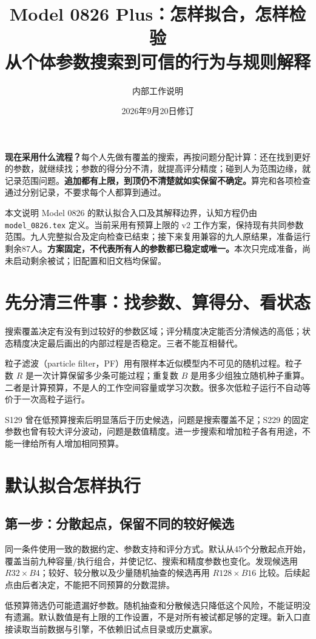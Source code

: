 \documentclass[11pt]{article}
\title{Model 0826 Plus：怎样拟合，怎样检验\\\large 从个体参数搜索到可信的行为与规则解释}
\author{内部工作说明}
\date{2026年9月20日修订}
\newcommand{\term}[1]{\textbf{#1}}
\begin{document}
\maketitle
\noindent\term{现在采用什么流程？}每个人先做有覆盖的搜索，再按问题分配计算：还在找到更好的参数，就继续找；参数的得分分不清，就提高评分精度；碰到人为范围边缘，就记录范围问题。\term{追加都有上限，到顶仍不清楚就如实保留不确定。}算完和各项检查通过分别记录，不要求每个人都算到通过。

本文说明 Model 0826 的默认拟合入口及其解释边界，认知方程仍由 \texttt{model\_0826.tex} 定义。当前采用有预算上限的 v2 工作方案，保持现有共同参数范围。九人完整拟合及定向检查已结束；接下来复用兼容的九人原结果，准备运行剩余87人。\term{方案固定，不代表所有人的参数都已稳定或唯一。}本次只完成准备，尚未启动剩余被试；旧配置和旧文档均保留。

\section{先分清三件事：找参数、算得分、看状态}
搜索覆盖决定有没有到过较好的参数区域；评分精度决定能否分清候选的高低；状态精度决定最后画出的内部过程是否稳定。三者不能互相替代。

粒子滤波（particle filter，PF）用有限样本近似模型内不可见的随机过程。粒子数 $R$ 是一次计算保留多少条可能过程；重复数 $B$ 是用多少组独立随机种子重算。二者是计算预算，不是人的工作空间容量或学习次数。很多次低粒子运行不自动等价于一次高粒子运行。

S129 曾在低预算搜索后明显落后于历史候选，问题是搜索覆盖不足；S229 的固定参数也曾有较大评分波动，问题是数值精度。进一步搜索和增加粒子各有用途，不能一律给所有人增加相同预算。

\section{默认拟合怎样执行}
\subsection{第一步：分散起点，保留不同的较好候选}
同一条件使用一致的数据约定、参数支持和评分方式。默认从45个分散起点开始，覆盖当前九种容量/执行组合，并使记忆、搜索和精度参数也变化。发现候选用 $R32\times B4$；较好、较分散以及少量随机抽查的候选再用 $R128\times B16$ 比较。后续起点由后者决定，不能把不同预算的分数混排。

低预算筛选仍可能遗漏好参数。随机抽查和分散候选只降低这个风险，不能证明没有遗漏。默认数值是有上限的工作设置，不是对所有被试都足够的定理。新入口直接读取当前数据与引擎，不依赖旧试点目录或历史赢家。
\end{document}
